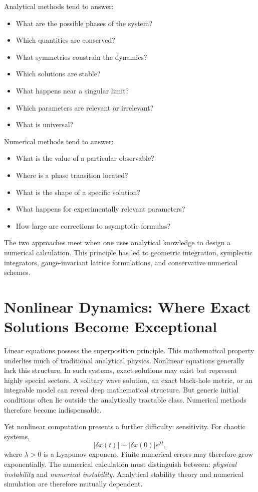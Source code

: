 Analytical methods tend to answer:
\begin{itemize}
\item What are the possible phases of the system?
\item Which quantities are conserved?
\item What symmetries constrain the dynamics?
\item Which solutions are stable?
\item What happens near a singular limit?
\item Which parameters are relevant or irrelevant?
\item What is universal?
\end{itemize}
Numerical methods tend to answer:
\begin{itemize}
\item What is the value of a particular observable?
\item Where is a phase transition located?
\item What is the shape of a specific solution?
\item What happens for experimentally relevant parameters?
\item How large are corrections to asymptotic formulas?
\end{itemize}
The two approaches meet when one uses analytical knowledge to design a 
numerical calculation.
This principle has led to geometric integration, symplectic integrators,
gauge-invariant lattice formulations, and conservative numerical schemes.

\section{ Nonlinear Dynamics: Where Exact Solutions Become Exceptional}
Linear equations possess the superposition principle.
This mathematical property underlies much of traditional analytical physics.
Nonlinear equations generally lack this structure.
In such systems, exact solutions may exist but represent highly special
sectors.
A solitary wave solution, an exact black-hole metric, or an integrable model
can reveal deep mathematical structure. But generic initial conditions often
lie outside the analytically tractable class.
Numerical methods therefore become indispensable.

Yet nonlinear computation presents a further difficulty: sensitivity.
For chaotic systems,
\[|\delta x(t)|\sim |\delta x(0)|e^{\lambda t},\]
where $\lambda>0$ is a Lyapunov exponent.
Finite numerical errors may therefore grow exponentially.
The numerical calculation must distinguish between:
\emph{physical instability} and \emph{numerical instability}.
Analytical stability theory and numerical simulation are therefore mutually dependent.

